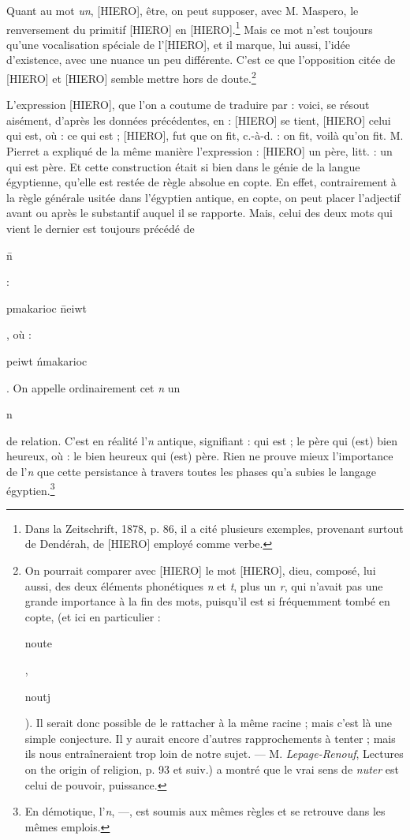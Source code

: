 \documentclass[a4paper, 11pt, oneside]{article}
\begin{document}
Quant au mot \emph{un}, [HIERO], être, on peut supposer, avec M. Maspero, le renversement du primitif [HIERO] en [HIERO].\footnote{Dans la Zeitschrift, 1878, p. 86, il a cité plusieurs exemples, provenant surtout de Dendérah, de [HIERO] employé comme verbe.} Mais ce mot n'est toujours qu'une vocalisation spéciale de l'[HIERO], et il marque, lui aussi, l'idée d'existence, avec une nuance un peu différente. C'est ce que l'opposition citée de [HIERO] et [HIERO] semble mettre hors de doute.\footnote{On pourrait comparer avec [HIERO] le mot [HIERO], dieu, composé, lui aussi, des deux éléments phonétiques \emph{n} et \emph{t}, plus un \emph{r}, qui n'avait pas une grande importance à la fin des mots, puisqu'il est si fréquemment tombé en copte, (et ici en particulier : \begin{coptic}noute\end{coptic}, \begin{coptic}noutj\end{coptic}). Il serait donc possible de le rattacher à la même racine ; mais c'est là une simple conjecture. Il y aurait encore d'autres rapprochements à tenter ; mais ils nous entraîneraient trop loin de notre sujet. --- M. \emph{Lepage-Renouf}, Lectures on the origin of religion, p. 93 et suiv.) a montré que le vrai sens de \emph{nuter} est celui de pouvoir, puissance.}

L'expression [HIERO], que l'on a coutume de traduire par : voici, se résout aisément, d'après les données précédentes, en : [HIERO] se tient, [HIERO] celui qui est, où : ce qui est ; [HIERO], fut que on fit, c.-à-d. : on fit, voilà qu'on fit. M. Pierret a expliqué de la même manière l'expression : [HIERO] un père, litt. : un qui est père. Et cette construction était si bien dans le génie de la langue égyptienne, qu'elle est restée de règle absolue en copte. En effet, contrairement à la règle générale usitée dans l'égyptien antique, en copte, on peut placer l'adjectif avant ou après le substantif auquel il se rapporte. Mais, celui des deux mots qui vient le dernier est toujours précédé de \begin{coptic}\=n\end{coptic} : \begin{coptic}pmakarioc \=neiwt\end{coptic}, où : \begin{coptic}peiwt \'nmakarioc\end{coptic}. On appelle ordinairement cet \emph{n} un \begin{coptic}n\end{coptic} de relation. C'est en réalité l'\emph{n} antique, signifiant : qui est ; le père qui (est) bien heureux, où : le bien heureux qui (est) père. Rien ne prouve mieux l'importance de l'\emph{n} que cette persistance à travers toutes les phases qu'a subies le langage égyptien.\footnote{En démotique, l'\emph{n}, ---, est soumis aux mêmes règles et se retrouve dans les mêmes emplois.}
\end{document}

